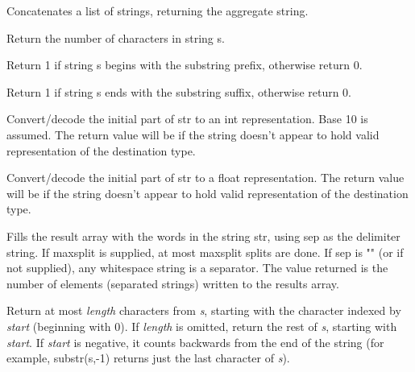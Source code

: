 \documentclass[11pt,letterpaper]{book}
\begin{document}
Concatenates a list of strings, returning the aggregate string.
\apiend

Return the number of characters in string {\ce s}.
\apiend

Return 1 if string {\cf s} begins with the substring {\cf prefix},
otherwise return 0.
\apiend

Return 1 if string {\cf s} ends with the substring {\cf suffix},
otherwise return 0.
\apiend

Convert/decode the initial part of {\cf str} to an {\cf int} 
representation.  Base 10 is assumed.
The return value will be {} if the string doesn't appear to hold
valid representation of the destination type.
\apiend

Convert/decode the initial part of {\cf str} to a {\cf float} representation.
The return value will be {} if the string doesn't appear to hold
valid representation of the destination type.
\apiend


Fills the {\cf result} array with the words in the string {\cf str},
using {\cf sep} as the delimiter string.  If {\cf maxsplit} is supplied,
at most {\cf maxsplit} splits are done.  If {\cf sep} is {\cf ""} (or if
not supplied), any whitespace string is a separator.  The value returned
is the number of elements (separated strings) written to the {\cf results}
array.
\apiend

Return at most \emph{length} characters from \emph{s}, starting with the
character indexed by \emph{start} (beginning with 0).  If \emph{length}
is omitted, return the rest of \emph{s}, starting with \emph{start}.  If
\emph{start} is negative, it counts backwards from the end of the string
(for example, {\cf substr(s,-1)} returns just the last character of
\emph{s}).
\apiend
\end{document}
